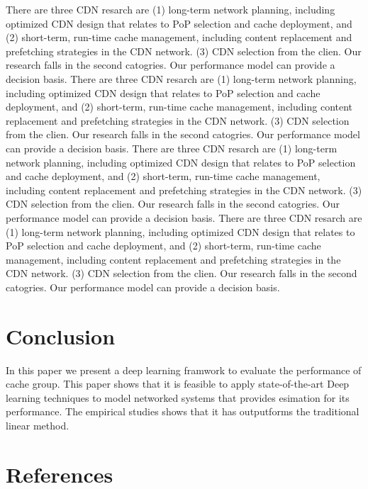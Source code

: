 \documentclass[5p]{elsarticle}
\begin{document}
There are three CDN resarch are (1) long-term network planning, including optimized CDN design that relates to PoP selection and cache deployment, and (2) short-term, run-time cache management, including content replacement and prefetching strategies in the CDN network. (3) CDN selection from the clien. Our research falls in the second catogries. Our performance model can provide a decision basis.
There are three CDN resarch are (1) long-term network planning, including optimized CDN design that relates to PoP selection and cache deployment, and (2) short-term, run-time cache management, including content replacement and prefetching strategies in the CDN network. (3) CDN selection from the clien. Our research falls in the second catogries. Our performance model can provide a decision basis.
There are three CDN resarch are (1) long-term network planning, including optimized CDN design that relates to PoP selection and cache deployment, and (2) short-term, run-time cache management, including content replacement and prefetching strategies in the CDN network. (3) CDN selection from the clien. Our research falls in the second catogries. Our performance model can provide a decision basis.
There are three CDN resarch are (1) long-term network planning, including optimized CDN design that relates to PoP selection and cache deployment, and (2) short-term, run-time cache management, including content replacement and prefetching strategies in the CDN network. (3) CDN selection from the clien. Our research falls in the second catogries. Our performance model can provide a decision basis.
\section{Conclusion}

In this paper we present a deep learning framwork to evaluate the performance of cache group. This paper shows that it is feasible to apply state-of-the-art Deep learning techniques to model networked systems that provides esimation for its performance. The empirical studies shows that it has outputforms the traditional linear method.

\section*{References}


\end{document}
